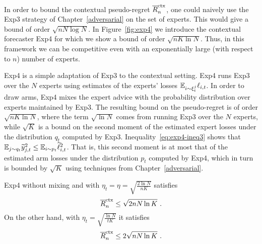 In order to bound the contextual pseudo-regret $\overline{R}^{\mathrm{ctx}}_n$, one could naively use the Exp3 strategy of Chapter~\ref{adversarial} on the set of experts. This would give a bound of order $\sqrt{n N \log N}$. In Figure~\ref{fig:exp4} we introduce the contextual forecaster Exp4 for which we show a bound of order $\sqrt{n K \ln N}$. Thus, in this framework we can be competitive even with an exponentially large (with respect to $n$) number of experts.

Exp4 is a simple adaptation of Exp3 to the contextual setting. Exp4 runs Exp3 over the $N$ experts using estimates of the experts' losses $\mathbb{E}_{i \sim \xi_t^j} \ell_{i,t}$. In order to draw arms, Exp4 mixes the expert advice with the probability distribution over experts maintained by Exp3. The resulting bound on the pseudo-regret is of order $\sqrt{nK\ln N}$, where the term $\sqrt{\ln N}$ comes from running Exp3 over the $N$ experts, while $\sqrt{K}$ is a bound on the second moment of the estimated expert losses under the distribution $q_t$ computed by Exp3. Inequality~\eqref{eq:exp4-ineq3} shows that $\mathbb{E}_{j \sim q_t} \widetilde{y}^2_{j,t} \le \mathbb{E}_{i \sim p_t} \widetilde{\ell}_{i,t}^2$. That is, this second moment is at most that of the estimated arm losses under the distribution $p_t$ computed by Exp4, which in turn is bounded by $\sqrt{K}$ using techniques from Chapter~\ref{adversarial}.
%
\begin{theorem}
\label{th:Exp4}
Exp4 without mixing and with $\eta_t=\eta = \sqrt{\frac{2 \ln N}{n K}}$ satisfies
\begin{equation} \label{eq:exp4bound}
	\overline{R}^{\mathrm{ctx}}_n \leq \sqrt{2 n N \ln K}~.
\end{equation}
On the other hand, with $\eta_t = \sqrt{\frac{\ln N}{t K}}$ it satisfies
\begin{equation} \label{eq:exp4boundanytime}
	\overline{R}^{\mathrm{ctx}}_n \leq 2 \sqrt{n N \ln K}~.
\end{equation}
\end{theorem}

